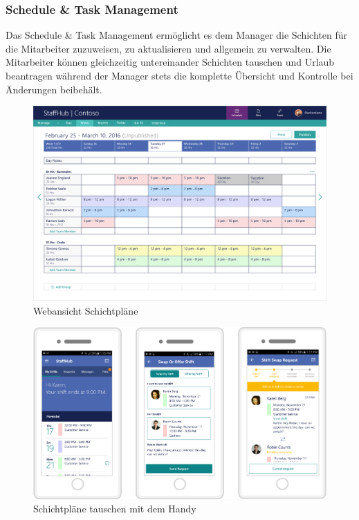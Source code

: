 \subsubsection{Schedule \& Task Management}
Das Schedule \& Task Management ermöglicht es dem Manager die Schichten für die Mitarbeiter zuzuweisen, zu aktualisieren und allgemein zu verwalten. Die Mitarbeiter können gleichzeitig untereinander Schichten tauschen und Urlaub beantragen während der Manager stets die komplette Übersicht und Kontrolle bei Änderungen beibehält. 

\begin{figure}[H] 
\centering 
\includegraphics[scale=0.48]{images/schedule} 
\caption[Webansicht Schichtpläne]{Webansicht Schichtpläne\protect} 
\label{ws} 
\end{figure}

\begin{figure}[H] 
\centering 
\includegraphics[scale=0.48]{images/schedulemobile} 
\caption[Schichtpläne tauschen mit dem Handy]{Schichtpläne tauschen mit dem Handy\protect} 
\label{ws} 
\end{figure}

